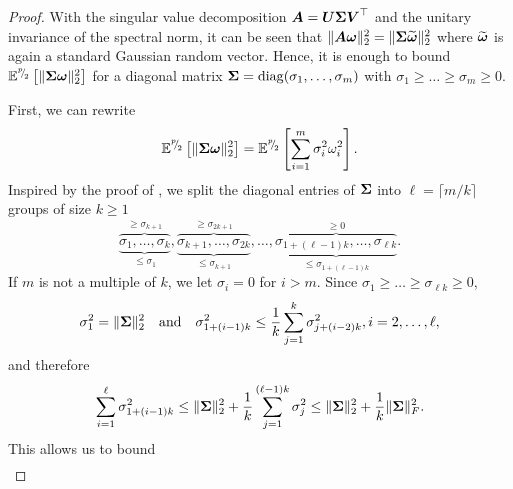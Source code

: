 \documentclass[12pt]{article}
\begin{document}
\begin{proof}
    With the singular value decomposition $\boldsymbol{A} = \boldsymbol{U} \boldsymbol{\Sigma} \boldsymbol{V}^{\top}$ and the unitary invariance of the spectral norm, it can be seen that $\lVert \boldsymbol{A} \boldsymbol{\omega} \rVert _2^2 = \lVert \boldsymbol{\Sigma} \widetilde{\boldsymbol{\omega}} \rVert _2^2$ where $\widetilde{\boldsymbol{\omega}}$ is again a standard Gaussian random vector. Hence, it is enough to bound $\mathbb{E}^{{}^{p}{\mskip -5mu/\mskip -3mu}_{2}}\left[ \lVert \boldsymbol{\Sigma} \boldsymbol{\omega} \rVert _2^2 \right]$ for a diagonal matrix $\boldsymbol{\Sigma} = \operatorname{diag}(\sigma_1, \dots, \sigma_m)$ with $\sigma_1 \geq \dots \geq \sigma_m \geq 0$.

    First, we can rewrite
    \begin{equation}
        \mathbb{E}^{{}^{p}{\mskip -5mu/\mskip -3mu}_{2}}\left[ \lVert \boldsymbol{\Sigma} \boldsymbol{\omega} \rVert _2^2 \right]
        = \mathbb{E}^{{}^{p}{\mskip -5mu/\mskip -3mu}_{2}}\left[ \sum_{i=1}^{m} \sigma_i^2 \omega_i^2 \right].
        \label{equ:matvec-spectral-norm-simplification}
    \end{equation}
    Inspired by the proof of \cite[theorem 1]{cohen-2016-optimal-approximate}, we split the diagonal entries of $\boldsymbol{\Sigma}$ into $\ell = \lceil m/k \rceil$ groups of size $k \geq 1$
    \begin{equation}
        \overbrace{\underbrace{\sigma_1, \dots, \sigma_k}_{\leq \sigma_1}}^{\geq \sigma_{k+1}}, \overbrace{\underbrace{\sigma_{k+1}, \dots, \sigma_{2k}}_{\leq \sigma_{k+1}}}^{\geq \sigma_{2k+1}}, \dots, \overbrace{\underbrace{\sigma_{1+(\ell - 1)k}, \dots, \sigma_{\ell k}}_{\leq \sigma_{1+(\ell - 1)k}}}^{\geq 0}.
    \end{equation}
    If $m$ is not a multiple of $k$, we let $\sigma_i = 0$ for $i > m$. Since $\sigma_1 \geq \dots \geq \sigma_{\ell k} \geq 0$,
    \begin{equation}
        \sigma_1^2 = \lVert \boldsymbol{\Sigma} \rVert _2^2
        \quad \text{and} \quad
        \sigma_{1 + (i-1)k}^2 \leq \frac{1}{k} \sum_{j=1}^{k} \sigma_{j + (i-2)k}^2, i = 2, \dots, \ell,
    \end{equation}
    and therefore
    \begin{equation}
        \sum_{i=1}^{\ell} \sigma_{1 + (i-1)k}^2 \leq \lVert \boldsymbol{\Sigma} \rVert _2^2 + \frac{1}{k} \sum_{j=1}^{(\ell - 1)k} \sigma_j^2 \leq \lVert \boldsymbol{\Sigma} \rVert _2^2 + \frac{1}{k} \lVert \boldsymbol{\Sigma} \rVert _F^2.
        \label{equ:singular-value-group-bound}
    \end{equation}
    This allows us to bound
    \begin{align}

\end{align}
\end{proof}
\end{document}
